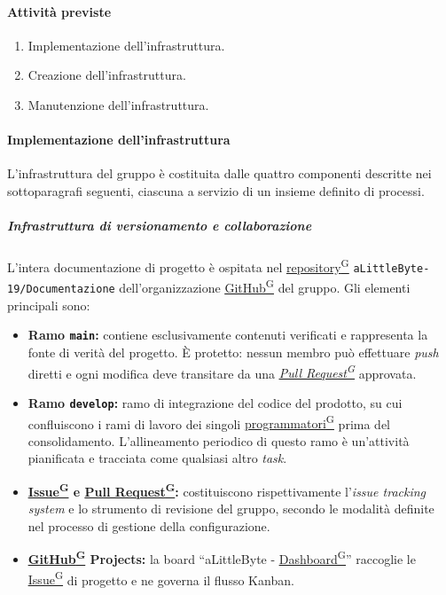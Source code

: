 \documentclass[a4paper,12pt]{article}
\providecommand{\glslink}[2]{\href{https://alittlebyte-19.github.io/Documentazione/glossario.html\#gls-#1}{\underline{#2}\textsuperscript{\scriptsize G}}}
\begin{document}
\paragraph{Attività previste}
\begin{enumerate}
    \item Implementazione dell'infrastruttura.
    \item Creazione dell'infrastruttura.
    \item Manutenzione dell'infrastruttura.
\end{enumerate}

\paragraph{Implementazione dell'infrastruttura}
L'infrastruttura del gruppo è costituita dalle quattro componenti descritte nei sottoparagrafi seguenti, ciascuna a servizio di un insieme definito di processi.

\subparagraph{Infrastruttura di versionamento e collaborazione}
L'intera documentazione di progetto è ospitata nel \glslink{repository}{repository} \texttt{aLittleByte-19/Documentazione} dell'organizzazione \glslink{github}{GitHub} del gruppo. Gli elementi principali sono:
\begin{itemize}
    \item \textbf{Ramo \texttt{main}:} contiene esclusivamente contenuti verificati e rappresenta la fonte di verità del progetto. È protetto: nessun membro può effettuare \textit{push} diretti e ogni modifica deve transitare da una \textit{\glslink{pull-request}{Pull Request}} approvata.
    \item \textbf{Ramo \texttt{develop}:} ramo di integrazione del codice del prodotto, su cui confluiscono i rami di lavoro dei singoli \glslink{programmatore}{programmatori} prima del consolidamento. L'allineamento periodico di questo ramo è un'attività pianificata e tracciata come qualsiasi altro \textit{task}.
    \item \textbf{\glslink{issue}{Issue} e \glslink{pull-request}{Pull Request}:} costituiscono rispettivamente l'\textit{issue tracking system} e lo strumento di revisione del gruppo, secondo le modalità definite nel processo di gestione della configurazione.
    \item \textbf{\glslink{github}{GitHub} Projects:} la board ``aLittleByte - \glslink{dashboard}{Dashboard}'' raccoglie le \glslink{issue}{Issue} di progetto e ne governa il flusso Kanban.
\end{itemize}
\end{document}
